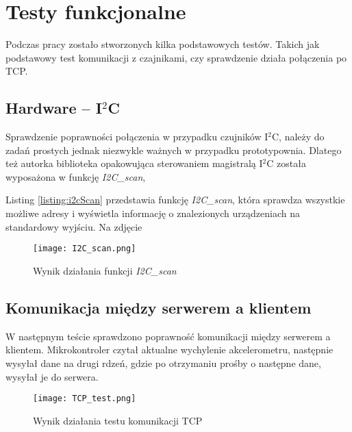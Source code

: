 \section{Testy funkcjonalne}
    Podczas pracy zostało stworzonych kilka podstawowych testów.
    Takich jak podstawowy test komunikacji z czajnikami, czy sprawdzenie działa połączenia po TCP.

    \subsection{Hardware -- I$^2$C}
        Sprawdzenie poprawności połączenia w przypadku czujników I$^2$C, należy do zadań prostych jednak niezwykle ważnych w przypadku prototypownia.
        Dlatego też autorka biblioteka opakowująca sterowaniem magistralą I$^2$C została wyposażona w funkcję \textit{I2C\_scan},

        

        Listing \ref{listing:i2cScan} przedstawia funkcję \textit{I2C\_scan}, która sprawdza wszystkie możliwe adresy i wyświetla informację o znalezionych urządzeniach na standardowy wyjściu.
        Na zdjęcie 
        \begin{figure}[!ht]
            \centering
            \texttt{[image: I2C\_scan.png]}
            \caption{Wynik działania funkcji \textit{I2C\_scan}}
        \end{figure}

    \subsection{Komunikacja między serwerem a klientem}
        W następnym teście sprawdzono poprawność komunikacji między serwerem a klientem.
        Mikrokontroler czytał aktualne wychylenie akcelerometru, następnie wysyłał dane na drugi rdzeń, gdzie po otrzymaniu prośby o następne dane, wysyłał je do serwera.
        \begin{figure}[!ht]
            \centering
            \texttt{[image: TCP\_test.png]}
            \caption{Wynik działania testu komunikacji TCP}
        \end{figure}